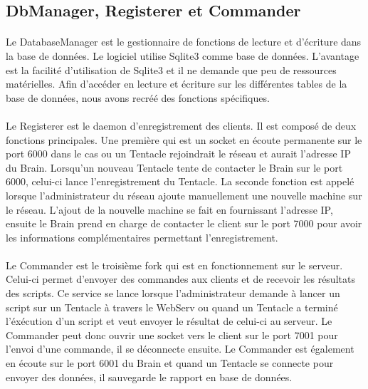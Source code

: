 \subsection{DbManager, Registerer et Commander}
\paragraph{}
Le DatabaseManager est le gestionnaire de fonctions de lecture et d'écriture dans la base de données. Le logiciel utilise Sqlite3 comme base de données. L'avantage est la facilité d'utilisation de Sqlite3 et il ne demande que peu de ressources matérielles. 
Afin d'accéder en lecture et écriture sur les différentes tables de la base de données, nous avons recréé des fonctions spécifiques.
\paragraph{}
Le Registerer est le daemon d'enregistrement des clients. Il est composé de deux fonctions principales. 
Une première qui est un socket en écoute permanente sur le port 6000 dans le cas ou un Tentacle rejoindrait le réseau et aurait l'adresse IP du Brain. Lorsqu'un nouveau Tentacle tente de contacter le Brain sur le port 6000, celui-ci lance l'enregistrement du Tentacle.
La seconde fonction est appelé lorsque l'administrateur du réseau ajoute manuellement une nouvelle machine sur le réseau. 
L'ajout de la nouvelle machine se fait en fournissant l'adresse IP, ensuite le Brain prend en charge de contacter le client sur le port 7000 pour avoir les informations complémentaires permettant l'enregistrement.
\paragraph{}
Le Commander est le troisième fork qui est en fonctionnement sur le serveur. Celui-ci permet d'envoyer des commandes aux clients et de recevoir les résultats des scripts. 
Ce service se lance lorsque l'administrateur demande à lancer un script sur un Tentacle à travers le WebServ ou quand un Tentacle a terminé l'éxécution d'un script et veut envoyer le résultat de celui-ci au serveur. 
Le Commander peut donc ouvrir une socket vers le client sur le port 7001 pour l'envoi d'une commande, il se déconnecte ensuite. Le Commander est également en écoute sur le port 6001 du Brain et quand un Tentacle se connecte pour envoyer des données, il sauvegarde le rapport en base de données.